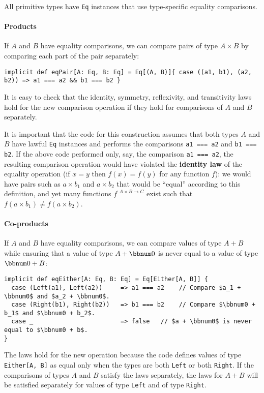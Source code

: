 All primitive types have \lstinline!Eq! instances that use type-specific
equality comparisons.

\paragraph{Products}

If $A$ and $B$ have equality comparisons, we can compare pairs of
type $A\times B$ by comparing each part of the pair separately:
\begin{lstlisting}
implicit def eqPair[A: Eq, B: Eq] = Eq[(A, B)]{ case ((a1, b1), (a2, b2)) => a1 === a2 && b1 === b2 }
\end{lstlisting}
It is easy to check that the identity, symmetry, reflexivity, and
transitivity laws hold for the new comparison operation if they hold
for comparisons of $A$ and $B$ separately.

It is important that the code for this construction assumes that both
types $A$ and $B$ have lawful \lstinline!Eq! instances and performs
the comparisons \lstinline!a1 === a2! and \lstinline!b1 === b2!.
If the above code performed only, say, the comparison \lstinline!a1 === a2!,
the resulting comparison operation would have violated the \textbf{identity
law} of the equality operation (if $x=y$ then $f(x)=f(y)$ for any
function $f$): we would have pairs such as $a\times b_{1}$ and $a\times b_{2}$
that would be ``equal'' according to this definition, and yet many
functions $f^{:A\times B\rightarrow C}$ exist such that $f(a\times b_{1})\neq f(a\times b_{2})$.

\paragraph{Co-products}

If $A$ and $B$ have equality comparisons, we can compare values
of type $A+B$ while ensuring that a value of type $A+\bbnum 0$ is
never equal to a value of type $\bbnum 0+B$:
\begin{lstlisting}[mathescape=true]
implicit def eqEither[A: Eq, B: Eq] = Eq[Either[A, B]] {
  case (Left(a1), Left(a2))     => a1 === a2    // Compare $a_1 + \bbnum0$ and $a_2 + \bbnum0$.
  case (Right(b1), Right(b2))   => b1 === b2    // Compare $\bbnum0 + b_1$ and $\bbnum0 + b_2$.
  case _                        => false   // $a + \bbnum0$ is never equal to $\bbnum0 + b$.
}
\end{lstlisting}
The laws hold for the new operation because the code defines values
of type \lstinline!Either[A, B]! as equal only when the types are
both \lstinline!Left! or both \lstinline!Right!. If the comparisons
of types $A$ and $B$ satisfy the laws separately, the laws for $A+B$
will be satisfied separately for values of type \lstinline!Left!
and of type \lstinline!Right!.

